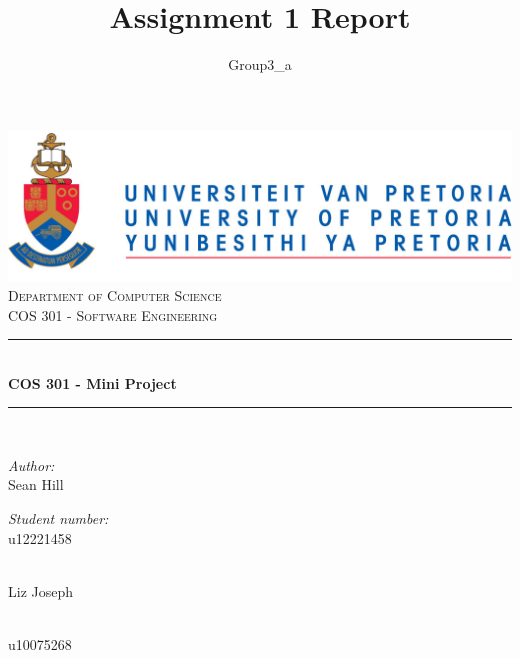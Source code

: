 \documentclass[a4paper,12pt]{report}
\author{Group3_a}
\title{ Assignment 1 Report}
\newcommand{\HRule}{\rule{\linewidth}{0.5mm}}
\begin{document}
\setlength{\parskip}{6pt}

\begin{titlepage}

\begin{center}
\includegraphics[width=1\textwidth]{./University_of_Pretoria_Logo.PNG}\\[0.4cm]    
\textsc{\LARGE Department of Computer Science}\\[1.5cm]
\textsc{\Large COS 301 - Software Engineering}\\[0.5cm]
\HRule \\[0.4cm]
{ \huge \bfseries COS 301 - Mini Project}\\[0.4cm]
\HRule \\[0.4cm]
\begin{minipage}{0.4\textwidth}
\begin{flushleft} \large
\emph{Author:}\\
Sean {Hill}
\end{flushleft}
\end{minipage}
\begin{minipage}{0.4\textwidth}
\begin{flushright} \large
\emph{Student number:} \\
u12221458
\end{flushright}
\end{minipage}
\begin{minipage}{0.4\textwidth}
\begin{flushleft} \large
\emph{} \\
Liz {Joseph}
\end{flushleft}
\end{minipage}
\begin{minipage}{0.4\textwidth}
\begin{flushright} \large
\emph{} \\
u10075268
\end{flushright}
\end{minipage}
\begin{minipage}{0.4\textwidth}
\begin{flushleft} \large

\end{flushleft}
\end{minipage}
\end{center}
\end{titlepage}
\end{document}
